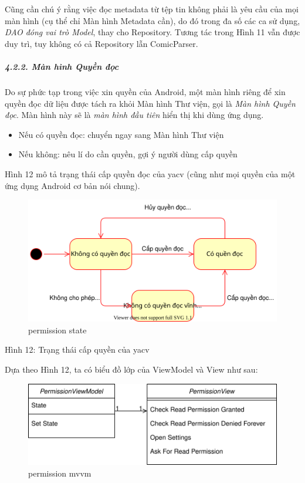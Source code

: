 \documentclass[
]{article}
\begin{document}
Cũng cần chú ý rằng việc đọc metadata từ tệp tin không phải là yêu cầu
của mọi màn hình (cụ thể chỉ Màn hình Metadata cần), do đó trong đa số
các ca sử dụng, \emph{DAO đóng vai trò Model}, thay cho Repository.
Tương tác trong Hình 11 vẫn được duy trì, tuy không có cả Repository lẫn
ComicParser.

\hypertarget{muxe0n-huxecnh-quyux1ec1n-ux111ux1ecdc}{%
\subparagraph{\texorpdfstring{4.2.2. Màn hình Quyền đọc
}{4.2.2. Màn hình Quyền đọc }}\label{muxe0n-huxecnh-quyux1ec1n-ux111ux1ecdc}}

Do sự phức tạp trong việc xin quyền của Android, một màn hình riêng để
xin quyền đọc dữ liệu được tách ra khỏi Màn hình Thư viện, gọi là
\emph{Màn hình Quyền đọc}. Màn hình này sẽ là \emph{màn hình đầu tiên}
hiển thị khi dùng ứng dụng.

\begin{itemize}
\item
  Nếu có quyền đọc: chuyển ngay sang Màn hình Thư viện
\item
  Nếu không: nêu lí do cần quyền, gợi ý người dùng cấp quyền
\end{itemize}

Hình 12 mô tả trạng thái cấp quyền đọc của yacv (cũng như mọi quyền của
một ứng dụng Android cơ bản nói chung).

\begin{figure}
\centering
\includegraphics{../images/read_permission_state.svg}
\caption{permission state}
\end{figure}

Hình 12: Trạng thái cấp quyền của yacv

Dựa theo Hình 12, ta có biểu đồ lớp của ViewModel và View như sau:

\begin{figure}
\centering
\includegraphics{../images/read_permission_mvvm_class.svg}
\caption{permission mvvm}
\end{figure}
\end{document}
